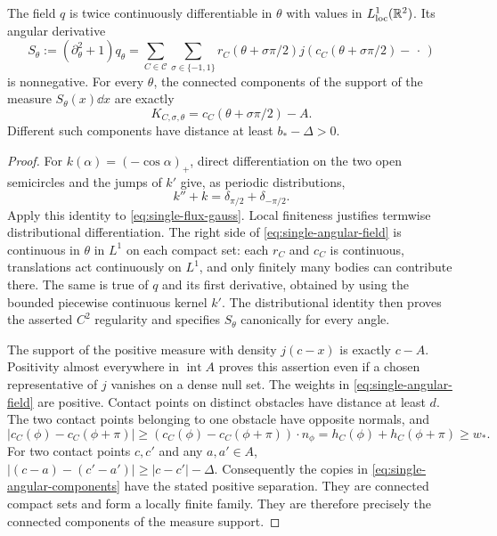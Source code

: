 \begin{lemma}
\label{lem:single-angular-resolution}
The field $q$ is twice continuously differentiable in $\theta$ with
values in $L^1_{\mathrm{loc}}(\mathbb R^2)$.  Its angular derivative
\begin{equation}\label{eq:single-angular-field}
 S_\theta:=(\partial_\theta^2+1)q_\theta
   =\sum_{C\in\mathcal C}\sum_{\sigma\in\{-1,1\}}
       r_C(\theta+\sigma\pi/2)
       j(c_C(\theta+\sigma\pi/2)-\,\cdot\,)
\end{equation}
is nonnegative.  For every $\theta$, the connected components of
the support of the measure $S_\theta(x)\dd x$ are exactly
\begin{equation}\label{eq:single-angular-components}
 K_{C,\sigma,\theta}=c_C(\theta+\sigma\pi/2)-A.
\end{equation}
Different such components have distance at least $b_*-\Delta>0$.
\end{lemma}
\begin{proof}
For $k(\alpha)=(-\cos\alpha)_+$, direct differentiation on the
two open semicircles and the jumps of $k'$ give, as periodic
distributions,
\begin{equation}\label{eq:single-cosine-distribution}
             k''+k=\delta_{\pi/2}+\delta_{-\pi/2}.
\end{equation}
Apply this identity to \eqref{eq:single-flux-gauss}.  Local finiteness
justifies termwise distributional differentiation.  The right side
of \eqref{eq:single-angular-field} is continuous in $\theta$ in
$L^1$ on each compact set: each $r_C$ and $c_C$ is continuous,
translations act continuously on $L^1$, and only finitely many bodies
can contribute there.  The same is true of $q$ and its first
derivative, obtained by using the bounded piecewise continuous kernel
$k'$.  The distributional identity then proves the asserted $C^2$
regularity and specifies $S_\theta$ canonically for every angle.

The support of the positive measure with density
$j(c-x)$ is exactly $c-A$.  Positivity almost everywhere in
$\operatorname{int}A$ proves this assertion even if a chosen
representative of $j$ vanishes on a dense null set.  The weights in
\eqref{eq:single-angular-field} are positive.  Contact points on
distinct obstacles have distance at least $d$.  The two contact
points belonging to one obstacle have opposite normals, and
\[
 |c_C(\phi)-c_C(\phi+\pi)|
 \ge (c_C(\phi)-c_C(\phi+\pi))\cdot n_\phi
 =h_C(\phi)+h_C(\phi+\pi)\ge w_*.
\]
For two contact points $c,c'$ and any $a,a'\in A$,
$|(c-a)-(c'-a')|\ge|c-c'|-\Delta$.
Consequently the copies in \eqref{eq:single-angular-components}
have the stated positive separation.  They are connected compact
sets and form a locally finite family.  They are therefore precisely
the connected components of the measure support.
\end{proof}

